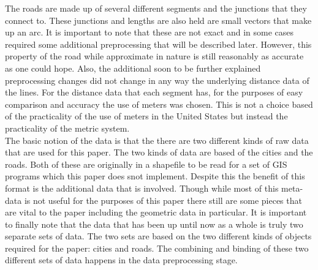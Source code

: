 \documentclass[midd]{thesis}
\newcommand{\tab}{\hspace*{2em}}
\begin{document}
\tab The roads are made up of several different segments and the junctions that they connect to. These junctions and lengths are also held are small vectors that make up an arc. It is important to note that these are not exact and in some cases required some additional preprocessing that will be described later. However, this property of the road while approximate in nature is still reasonably as accurate as one could hope. Also, the additional soon to be further explained preprocessing changes did not change in any way the underlying distance data of the lines. For the distance data that each segment has, for the purposes of easy comparison and accuracy the use of meters was chosen. This is not a choice based of the practicality of the use of meters in the United States but instead the practicality of the metric system.\\
\tab The basic notion of the data is that the there are two different kinds of raw data that are used for this paper. The two kinds of data are based of the cities and the roads. Both of these are originally in a shapefile to be read for a set of GIS programs which this paper does snot implement. Despite this the benefit of this format is the additional data that is involved. Though while most of this meta-data is not useful for the purposes of this paper there still are some pieces that are vital to the paper including the geometric data in particular. It is important to finally note that the data that has been up until now as a whole is truly two separate sets of data. The two sets are based on the two different kinds of objects required for the paper: cities and roads. The combining and binding of these two different sets of data happens in the data preprocessing stage.
\end{document}
